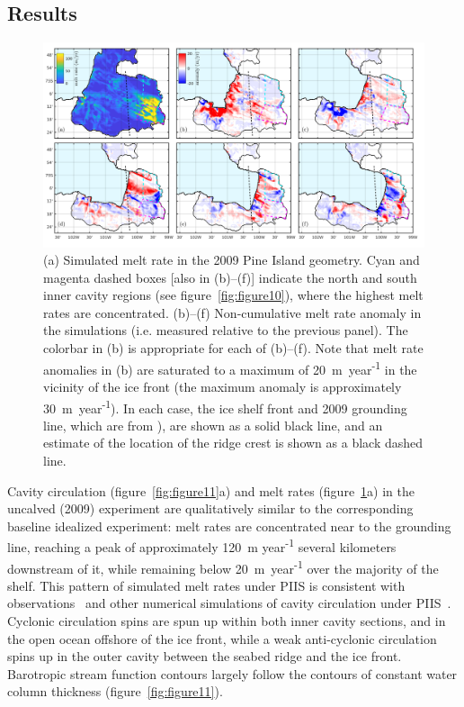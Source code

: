 \documentclass[draft]{agujournal2019}
\begin{document}
\subsection{Results}

\begin{figure}
    \centering
    \includegraphics[width = \textwidth]{../make_figures/plots/figure12.pdf}
    \caption{(a) Simulated melt rate in the 2009 Pine Island geometry. Cyan and magenta dashed boxes [also in (b)--(f)] indicate the north and south inner cavity regions (see figure~\ref{fig:figure10}), where the highest melt rates are concentrated. (b)--(f) Non-cumulative melt rate anomaly in the simulations (i.e. measured relative to the previous panel). The colorbar in (b) is appropriate for each of (b)--(f). Note that melt rate anomalies in (b) are saturated to a maximum of 20~m~year\textsuperscript{-1} in the vicinity of the ice front (the maximum anomaly is approximately 30~m~year\textsuperscript{-1}). In each case, the ice shelf front and 2009 grounding line, which are from ), are shown as a solid black line, and an estimate of the location of the ridge crest is shown as a black dashed line.}
    \label{fig:figure12}
\end{figure}


Cavity circulation (figure~\ref{fig:figure11}a) and melt rates (figure~\ref{fig:figure12}a) in the uncalved (2009) experiment are qualitatively similar to the corresponding baseline idealized experiment: melt rates are concentrated near to the grounding line, reaching a peak of approximately 120~m year\textsuperscript{-1} several kilometers downstream of it, while remaining below 20~m~year\textsuperscript{-1} over the majority of the shelf. This pattern of simulated melt rates under PIIS is consistent with observations~\cite{Dutrieux2013Cryosphere} and other numerical simulations of cavity circulation under PIIS~\cite[for example]{Heimbach2012AnnGlac}. Cyclonic circulation spins are spun up within both inner cavity sections, and in the open ocean offshore of the ice front, while a weak anti-cyclonic circulation spins up in the outer cavity between the seabed ridge and the ice front. Barotropic stream function contours largely follow the contours of constant water column thickness (figure~\ref{fig:figure11}).
\end{document}
